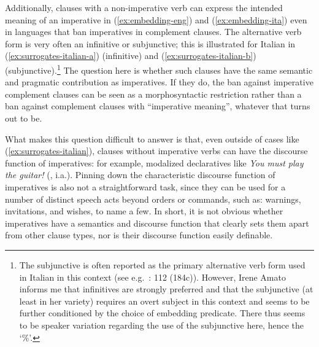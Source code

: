 \documentclass[output=paper,colorlinks,citecolor=brown]{langscibook}
\begin{document}
\noindent Additionally, clauses with a non-imperative verb can express the intended meaning of an imperative in (\ref{ex:embedding-eng}) and (\ref{ex:embedding-ita}) even in languages that ban imperatives in complement clauses. The alternative verb form is very often an infinitive or subjunctive; this is illustrated for Italian in (\ref{ex:surrogates-italian-a}) (infinitive) and (\ref{ex:surrogates-italian-b}) (subjunctive).\footnote{The subjunctive is often reported as the primary alternative verb form used in Italian in this context (see e.g.\ \cite{han98}: 112 (184c)). However, Irene Amato informs me that infinitives are strongly preferred and that the subjunctive (at least in her variety) requires an overt subject in this context and seems to be further conditioned by the choice of embedding predicate. There thus seems to be speaker variation regarding the use of the subjunctive here, hence the `\%'.} 
\ea \label{ex:surrogates-italian}
\z\z
The question here is whether such clauses have the same semantic and pragmatic contribution as imperatives. If they do, the ban against imperative complement clauses can be seen as a morphosyntactic restriction rather than a ban against complement clauses with ``imperative meaning'', whatever that turns out to be. 

What makes this question difficult to answer is that, even outside of cases like (\ref{ex:surrogates-italian}), clauses without imperative verbs can have the discourse function of imperatives: for example, modalized declaratives like \emph{You must play the guitar!} (\cite{ninan05,kaufmannBOOK}, i.a.). Pinning down the characteristic discourse function of imperatives is also not a straightforward task, since they can be used for a number of distinct speech acts beyond orders or commands, such as: warnings, invitations, and wishes, to name a few. In short, it is not obvious whether imperatives have a semantics and discourse function that clearly sets them apart from other clause types, nor is their discourse function easily definable.    
\end{document}
